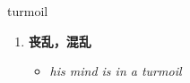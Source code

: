 
\begin{frame}
{\huge turmoil}
\begin{center}
\begin{enumerate}\Large
  \item \textbf{丧乱，混乱}
  \begin{itemize}
    \item \em{\Large{his mind is in a turmoil}}
  \end{itemize}
\end{enumerate}
\end{center}
\end{frame}
